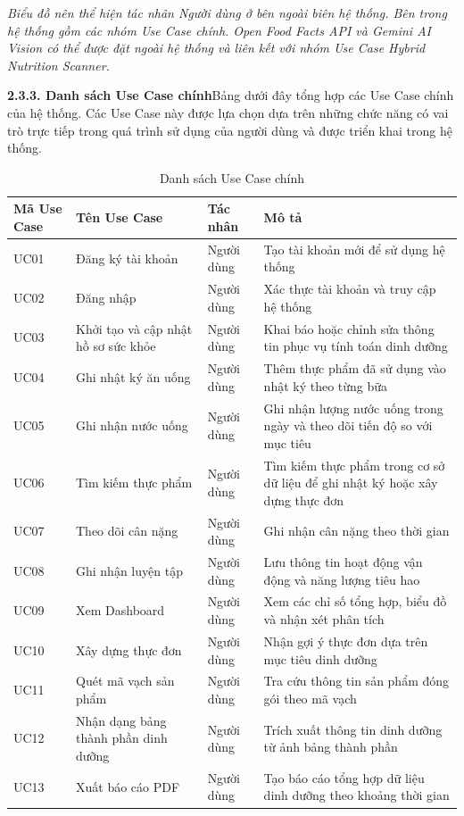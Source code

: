 \textit{Biểu đồ nên thể hiện tác nhân Người dùng ở bên ngoài biên hệ thống. Bên trong hệ thống gồm các nhóm Use Case chính. Open Food Facts API và Gemini AI Vision có thể được đặt ngoài hệ thống và liên kết với nhóm Use Case Hybrid Nutrition Scanner.}

\textbf{2.3.3. Danh sách Use Case chính}Bảng dưới đây tổng hợp các Use Case chính của hệ thống. Các Use Case này được lựa chọn dựa trên những chức năng có vai trò trực tiếp trong quá trình sử dụng của người dùng và được triển khai trong hệ thống.

\begin{table}[H]
\centering
\caption{Danh sách Use Case chính}
\begin{tabular}{|p{3cm}|p{4cm}|p{4cm}|p{4cm}|}
\hline
\textbf{Mã Use Case} & \textbf{Tên Use Case} & \textbf{Tác nhân} & \textbf{Mô tả} \\ \hline
UC01 & Đăng ký tài khoản & Người dùng & Tạo tài khoản mới để sử dụng hệ thống \\ \hline
UC02 & Đăng nhập & Người dùng & Xác thực tài khoản và truy cập hệ thống \\ \hline
UC03 & Khởi tạo và cập nhật hồ sơ sức khỏe & Người dùng & Khai báo hoặc chỉnh sửa thông tin phục vụ tính toán dinh dưỡng \\ \hline
UC04 & Ghi nhật ký ăn uống & Người dùng & Thêm thực phẩm đã sử dụng vào nhật ký theo từng bữa \\ \hline
UC05 & Ghi nhận nước uống & Người dùng & Ghi nhận lượng nước uống trong ngày và theo dõi tiến độ so với mục tiêu \\ \hline
UC06 & Tìm kiếm thực phẩm & Người dùng & Tìm kiếm thực phẩm trong cơ sở dữ liệu để ghi nhật ký hoặc xây dựng thực đơn \\ \hline
UC07 & Theo dõi cân nặng & Người dùng & Ghi nhận cân nặng theo thời gian \\ \hline
UC08 & Ghi nhận luyện tập & Người dùng & Lưu thông tin hoạt động vận động và năng lượng tiêu hao \\ \hline
UC09 & Xem Dashboard & Người dùng & Xem các chỉ số tổng hợp, biểu đồ và nhận xét phân tích \\ \hline
UC10 & Xây dựng thực đơn & Người dùng & Nhận gợi ý thực đơn dựa trên mục tiêu dinh dưỡng \\ \hline
UC11 & Quét mã vạch sản phẩm & Người dùng & Tra cứu thông tin sản phẩm đóng gói theo mã vạch \\ \hline
UC12 & Nhận dạng bảng thành phần dinh dưỡng & Người dùng & Trích xuất thông tin dinh dưỡng từ ảnh bảng thành phần \\ \hline
UC13 & Xuất báo cáo PDF & Người dùng & Tạo báo cáo tổng hợp dữ liệu dinh dưỡng theo khoảng thời gian \\ \hline
\end{tabular}
\end{table}

